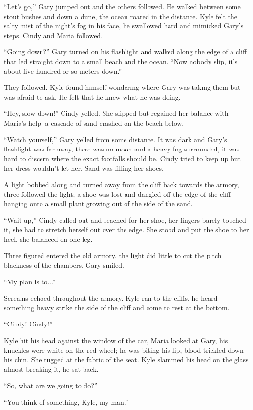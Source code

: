 ``Let's go,'' Gary jumped out and the others followed. He walked between
some stout bushes and down a dune, the ocean roared in the distance.
Kyle felt the salty mist of the night's fog in his face, he swallowed
hard and mimicked Gary's steps. Cindy and Maria followed.

``Going down?'' Gary turned on his flashlight and walked along the edge
of a cliff that led straight down to a small beach and the ocean. ``Now
nobody slip, it's about five hundred or so meters down.''

They followed. Kyle found himself wondering where Gary was taking them
but was afraid to ask. He felt that he knew what he was doing.

``Hey, slow down!'' Cindy yelled. She slipped but regained her balance
with Maria's help, a cascade of sand crashed on the beach below.

``Watch yourself,'' Gary yelled from some distance. It was dark and
Gary's flashlight was far away, there was no moon and a heavy fog
surrounded, it was hard to discern where the exact footfalls should be.
Cindy tried to keep up but her dress wouldn't let her. Sand was filling
her shoes.

A light bobbed along and turned away from the cliff back towards the
armory, three followed the light; a shoe was lost and dangled off the
edge of the cliff hanging onto a small plant growing out of the side of
the sand.

``Wait up,'' Cindy called out and reached for her shoe, her fingers
barely touched it, she had to stretch herself out over the edge. She
stood and put the shoe to her heel, she balanced on one leg.

Three figured entered the old armory, the light did little to cut the
pitch blackness of the chambers. Gary smiled.

``My plan is to...''

Screams echoed throughout the armory. Kyle ran to the cliffs, he heard
something heavy strike the side of the cliff and come to rest at the
bottom.

``Cindy! Cindy!''

Kyle hit his head against the window of the car, Maria looked at Gary,
his knuckles were white on the red wheel; he was biting his lip, blood
trickled down his chin. She tugged at the fabric of the seat. Kyle
slammed his head on the glass almost breaking it, he sat back.

``So, what are we going to do?''

``You think of something, Kyle, my man.''

